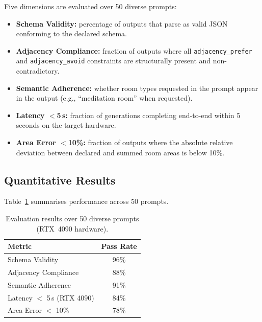 \documentclass[12pt, a4paper]{article}
\begin{document}
Five dimensions are evaluated over 50 diverse prompts:

\begin{itemize}[leftmargin=1.5em, itemsep=2pt]
    \item \textbf{Schema Validity:} percentage of outputs that parse as valid
          JSON conforming to the declared schema.
    \item \textbf{Adjacency Compliance:} fraction of outputs where all
          \texttt{adjacency\_prefer} and \texttt{adjacency\_avoid} constraints
          are structurally present and non-contradictory.
    \item \textbf{Semantic Adherence:} whether room types requested in the prompt
          appear in the output (e.g., ``meditation room'' when requested).
    \item \textbf{Latency $<$5\,s:} fraction of generations completing
          end-to-end within 5 seconds on the target hardware.
    \item \textbf{Area Error $<$10\%:} fraction of outputs where the absolute
          relative deviation between declared and summed room areas is below 10\%.
\end{itemize}

\subsection{Quantitative Results}

Table~\ref{tab:results} summarises performance across 50 prompts.

\begin{table}[H]
    \centering
    \caption{Evaluation results over 50 diverse prompts (RTX~4090 hardware).}
    \label{tab:results}
    \setlength{\tabcolsep}{10pt}
    \begin{tabular}{lc}
        \toprule
        \textbf{Metric}              & \textbf{Pass Rate} \\
        \midrule
        Schema Validity              & 96\% \\
        Adjacency Compliance         & 88\% \\
        Semantic Adherence           & 91\% \\
        Latency $<$ 5\,s (RTX 4090) & 84\% \\
        Area Error $<$ 10\%          & 78\% \\
        \bottomrule
    \end{tabular}
\end{table}
\end{document}

